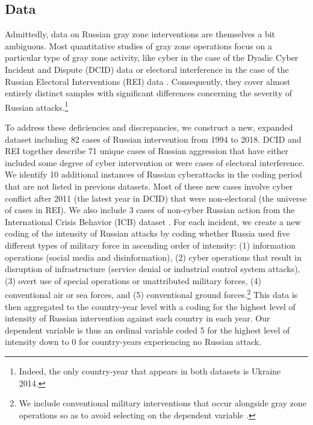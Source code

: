 \documentclass[bibtex, autowc]{apsr_submission}
\begin{document}
\subsection{Data}
Admittedly, data on Russian gray zone interventions are themselves a bit ambiguous. Most quantitative studies of gray zone operations focus on a particular type of gray zone activity, like cyber in the case of the Dyadic Cyber Incident and Dispute (DCID) data or electoral interference in the case of the Russian Electoral Interventions (REI) data \citep{valeriano_dynamicscyberconflict_2014, casey_russianelectoralinterventions_2017}. Consequently, they cover almost entirely distinct samples with significant differences concerning the severity of Russian attacks.\footnote{Indeed, the only country-year that appears in both datasets is Ukraine 2014.}

To address these deficiencies and discrepancies, we construct a new, expanded dataset including 82 cases of Russian intervention from 1994 to 2018. DCID and REI together describe 71 unique cases of Russian aggression that have either included some degree of cyber intervention or were cases of electoral interference. We identify 10 additional instances of Russian cyberattacks in the coding period that are not listed in previous datasets. Most of these new cases involve cyber conflict after 2011 (the latest year in DCID) that were non-electoral (the universe of cases in REI). We also include 3 cases of non-cyber Russian action from the International Crisis Behavior (ICB) dataset \citep{singer_capabilitydistributionuncertainty_1972}. For each incident, we create a new coding of the intensity of Russian attacks by coding whether Russia used five different types of military force in ascending order of intensity: (1) information operations (social media and disinformation), (2) cyber operations that result in disruption of infrastructure (service denial or industrial control system attacks), (3) overt use of special operations or unattributed military forces, (4) conventional air or sea forces, and (5) conventional ground forces.\footnote{We include conventional military interventions that occur alongside gray zone operations so as to avoid selecting on the dependent variable \citep{healey_escalationinversionother_2020, mares_georgia2008conflict_2020}.} This data is then aggregated to the country-year level with a coding for the highest level of intensity of Russian intervention against each country in each year. Our dependent variable is thus an ordinal variable coded 5 for the highest level of intensity down to 0 for country-years experiencing no Russian attack.
\end{document}
